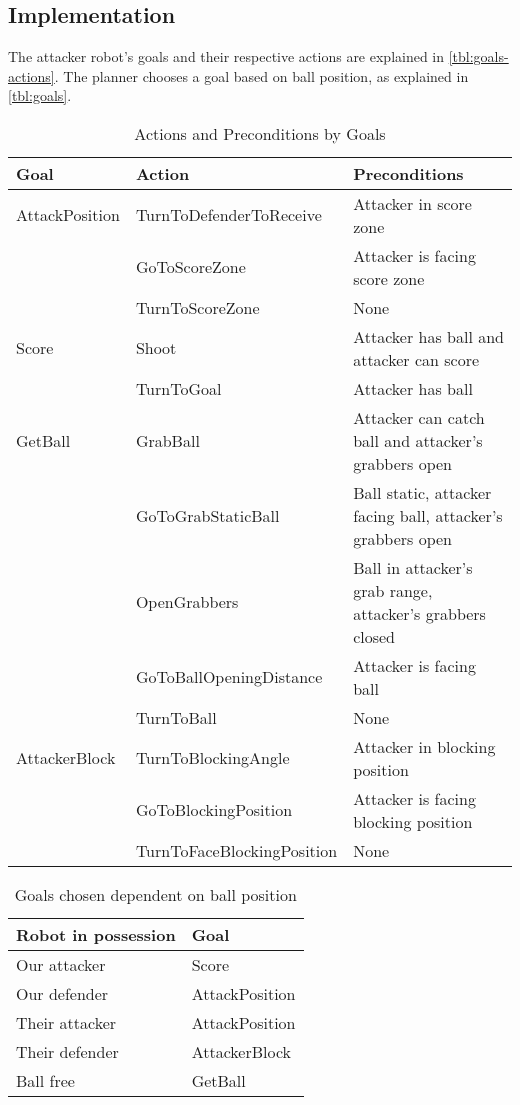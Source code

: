 \subsection{Implementation}

The attacker robot's goals and their respective actions are explained in \autoref{tbl:goals-actions}.
The planner chooses a goal based on ball position, as explained in \autoref{tbl:goals}.

\begin{table}[H]
\centering
\begin{tabularx}{\textwidth}{l l X}
\toprule
\textbf{Goal} & \textbf{Action} & \textbf{Preconditions} \\ 
\midrule

AttackPosition & TurnToDefenderToReceive & Attacker in score zone \\ 
&GoToScoreZone & Attacker is facing score zone  \\ 
&TurnToScoreZone & None \\
\midrule

Score & Shoot & Attacker has ball and attacker can score \\ 
& TurnToGoal & Attacker has ball \\ 
\midrule

GetBall & GrabBall & Attacker can catch ball and attacker's grabbers open \\ 
& GoToGrabStaticBall & Ball static, attacker facing ball, attacker's grabbers open \\ &OpenGrabbers & Ball in attacker's grab range, attacker's grabbers closed \\ 
&GoToBallOpeningDistance & Attacker is facing ball \\
&TurnToBall & None \\ 
\midrule

AttackerBlock & TurnToBlockingAngle & Attacker in blocking position \\ 
& GoToBlockingPosition & Attacker is facing blocking position \\ 
& TurnToFaceBlockingPosition & None \\ 
\bottomrule
\end{tabularx}
\caption{Actions and Preconditions by Goals}
\label{tbl:goals-actions}
\end{table}


\begin{table}[H]
\centering
\begin{tabular}{ l l}
\toprule
\textbf{Robot in possession} & \textbf{Goal} \\ \midrule
Our attacker & Score \\
Our defender & AttackPosition \\
Their attacker & AttackPosition \\
Their defender & AttackerBlock \\
Ball free & GetBall \\ \bottomrule
\end{tabular}
\caption{Goals chosen dependent on ball position}
\label{tbl:goals}
\end{table}

